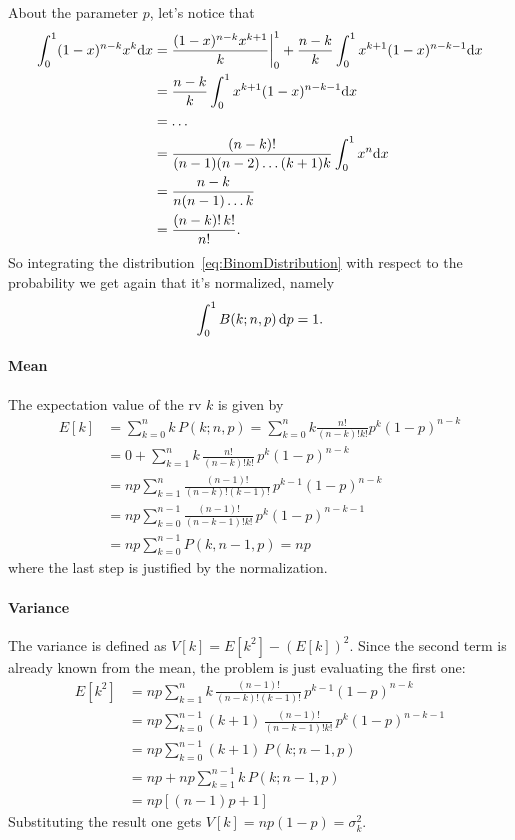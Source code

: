 About the parameter $p$, let's notice that
\begin{equation*}
	\begin{aligned}
		\int_0^1 (1-x)^{n-k}x^k\!\ud x 
		&= \frac{(1-x)^{n-k} x^{k+1}}{k}\bigg\rvert_0^1 +\frac{n-k}{k}\int_0^1 x^{k+1}(1-x)^{n-k-1}\!\ud x\\
  &=\frac{n-k}{k}\int_0^1 x^{k+1}(1-x)^{n-k-1}\!\ud x\\
  &=\dots\\
  &= \frac{(n-k)!}{(n-1)(n-2)\dots(k+1)k}\int_0^1 x^n\!\ud x\\
  &=\frac{n-k}{n(n-1)\dots k} \\
  &= \frac{(n-k)!\,k!}{n!}.
	\end{aligned}
\end{equation*}
So integrating the distribution~\eqref{eq:BinomDistribution} with respect to the probability we get again that it's normalized, namely
\begin{equation}
	\int_0^1B(k;n,p)\mathop{}\!\mathrm{d} p = 1.
\end{equation}


\paragraph{Mean} The expectation value of the \ac{rv} $k$ is given by
\begin{equation}
	\begin{aligned}
		E[k] &= \sum_{k=0}^n k\,P(k;n,p) = \sum_{k=0}^n k \frac{n!}{(n-k)!k!}p^k(1-p)^{n-k} \\
	   &= 0 + \sum_{k=1}^n k \,\frac{n!}{(n-k)!k!}\,p^k(1-p)^{n-k} \\
	&= np\sum_{k=1}^n \frac{(n-1)!}{(n-k)!(k-1)!}\,p^{k-1}(1-p)^{n-k} \\
 &= np\sum_{k=0}^{n-1} \frac{(n-1)!}{(n-k - 1)!k!}\,p^{k}(1-p)^{n-k - 1} \\
 &= np\sum_{k=0}^{n-1} P(k, n-1,p) = np
	\end{aligned}
\end{equation}
where the last step is justified by the normalization.

\paragraph{Variance}
The variance is defined as $V[k] = E[k^2] - (E[k])^2$.
Since the second term is already known from the mean, the problem is just evaluating the first one:
\begin{equation}
	\begin{aligned}
		E[k^2] &= np\sum_{k=1}^n k \,\frac{(n-1)!}{(n-k)! (k-1)!}\,p^{k-1}(1-p) ^{n - k}\\
		 &= np\sum_{k=0}^{n-1} (k + 1) \,\frac{(n-1)!}{(n-k - 1)! k!}\,p^{k}(1-p) ^{n - k-1}\\
   &= np\sum_{k=0}^{n-1} (k + 1) \,P(k;n-1,p)\\
   &= np  + np \sum_{k=1}^{n-1} k\, P(k;n-1,p)\\
   &=np[( n - 1 )p + 1 ]
	\end{aligned}
\end{equation}
Substituting the result one gets $V[k] = np(1-p) = \sigma_k^2$.



